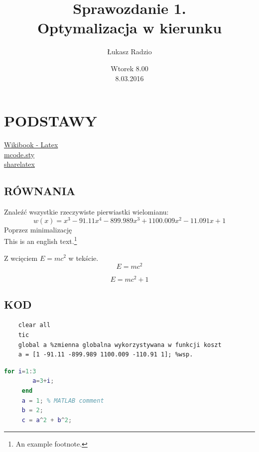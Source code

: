 \documentclass[11pt,a4paper]{article}
\author{Łukasz Radzio}
\title{Sprawozdanie 1.\\ Optymalizacja w kierunku }
\date{Wtorek 8.00\\8.03.2016}
\begin{document}
\maketitle
\section*{PODSTAWY}
\href{https://en.wikibooks.org/wiki/LaTeX/Hyperlinks}{Wikibook - Latex}\\
\href{http://www.mathworks.com/matlabcentral/fileexchange/8015-m-code-latex-package}{mcode.sty}\\
\href{https://www.sharelatex.com/learn/Positioning_images_and_tables}{sharelatex}\\
\subsection*{RÓWNANIA}%
Znaleźć wszystkie rzeczywiste pierwiastki wielomianu:
\[w(x)=x^3-91.11x^4-899.989x^3+1100.009x^2-11.091x+1\]
Poprzez minimalizację
\newline %
\\ %
This is an english text.\footnote{An example footnote.}

Z wcięciem $ E=mc^2 $ w tekście.
$$ E = mc^2 $$ %

\begin{equation} %
	E=mc^2 + 1
\end{equation}

\subsection*{KOD}

	\begin{verbatim} 
	clear all
	tic
	global a %zmienna globalna wykorzystywana w funkcji koszt
	a = [1 -91.11 -899.989 1100.009 -110.91 1]; %wsp.
	\end{verbatim}
	
	 \begin{lstlisting}[language=matlab]
	 for i=1:3
	 	a=3+i;
	 end
	 a = 1; % MATLAB comment 
	 b = 2; 
	 c = a^2 + b^2; 		     
	 \end{lstlisting}
	
\end{document}
